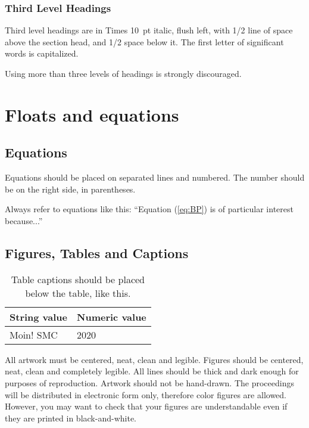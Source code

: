 \documentclass{article}
\begin{document}
\subsubsection{Third Level Headings}
Third level headings are in Times 10~pt italic, flush left, with 1/2 line of space above the section head, and 1/2 space below it. The first letter of significant words is capitalized.

Using more than three levels of headings is strongly discouraged.





\section{Floats and equations}

\subsection{Equations}
Equations should be placed on separated lines and numbered. The number should be on the right side, in parentheses.

Always refer to equations like this: ``Equation (\ref{eq:BP}) is of particular interest because...''

\subsection{Figures, Tables and Captions}
\begin{table}[t]
 \begin{center}
 \begin{tabular}{|l|l|}
  \hline
  String value & Numeric value \\
  \hline
  Moin! SMC & 2020 \\
  \hline
 \end{tabular}
\end{center}
 \caption{Table captions should be placed below the table,  like this.}
 \label{tab:example}
\end{table}

All artwork must be centered, neat, clean and legible. Figures should be centered, neat, clean
and completely legible. All lines should be thick and dark enough for purposes of reproduction. Artwork should not be hand-drawn. The proceedings will be distributed in electronic form only, therefore color figures are allowed. However, you may want to check that your figures are understandable even if they are printed in black-and-white.
\end{document}
